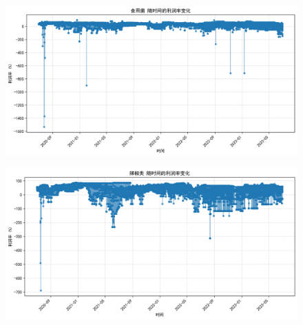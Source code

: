 \documentclass{cumcmthesis} %
\begin{document}
\begin{enumerate}
\begin{figure}[H]
            \begin{minipage}[c]{0.45\textwidth}
                \centering
                \includegraphics[width=\textwidth]{fig/食用菌_profit_ratio_over_time.png}
                \label{fig:sample-figure-c}
            \end{minipage}
            \begin{minipage}[c]{0.45\textwidth}
                \centering
                \includegraphics[width=\textwidth]{fig/辣椒_profit_ratio_over_time.png}
                \label{fig:sample-figure-d}
            \end{minipage}
            \vspace{1em} %


\end{figure}
\end{enumerate}
\end{document}
